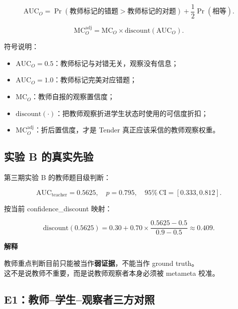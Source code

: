 \documentclass[UTF8,a4paper,11pt]{ctexart}
\newenvironment{explainbox}[1]
{\begin{center}\begin{minipage}{0.94\textwidth}\colorbox{boxbg}{\parbox{0.92\textwidth}{\textbf{#1}\par\vspace{2pt}}}}
{\end{minipage}\end{center}}
\begin{document}
\begin{equation}
\mathrm{AUC}_{O}
=
\Pr(\text{教师标记的错题}>\text{教师标记的对题})
+\frac12\Pr(\text{相等}).
\end{equation}

\begin{equation}
\mathrm{MC}_{O}^{\text{adj}}
=
\mathrm{MC}_{O}\times \mathrm{discount}(\mathrm{AUC}_{O}).
\end{equation}

符号说明：

\begin{itemize}[leftmargin=2em]
\item $\mathrm{AUC}_O=0.5$：教师标记与对错无关，观察没有信息；
\item $\mathrm{AUC}_O=1.0$：教师标记完美对应错题；
\item $\mathrm{MC}_O$：教师自报的观察置信度；
\item $\mathrm{discount}(\cdot)$：把教师观察折进学生状态时使用的可信度折扣；
\item $\mathrm{MC}_O^{\text{adj}}$：折后置信度，才是 Tender 真正应该采信的教师观察权重。
\end{itemize}

\subsection{实验 B 的真实先验}

第三期实验 B 的教师题目级判断：

\begin{equation}
\mathrm{AUC}_{\text{teacher}}=0.5625,\quad
p=0.795,\quad
95\%\ \mathrm{CI}=[0.333,0.812].
\end{equation}

按当前 confidence\_discount 映射：

\begin{equation}
\mathrm{discount}(0.5625)
=
0.30+0.70\times\frac{0.5625-0.5}{0.9-0.5}
\approx 0.409.
\end{equation}

\begin{explainbox}{解释}
教师重点判断目前只能被当作\textbf{弱证据}，不能当作 ground truth。\\
这不是说教师不重要，而是说教师观察者本身必须被 metameta 校准。
\end{explainbox}

\subsection{E1：教师--学生--观察者三方对照}
\end{document}
